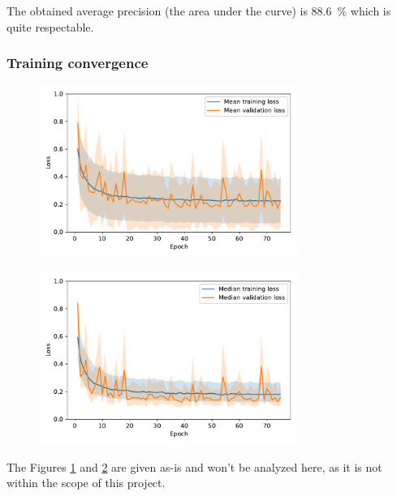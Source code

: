 \documentclass[a4paper, 12pt]{article}
\begin{document}
The obtained average precision (the area under the curve) is \SI{88.6}{\percent} which is quite respectable.

\subsubsection{Training convergence}

\begin{figure}[H]
    \centering
    \includegraphics[width=0.75\textwidth]{resources/pdf/mean_loss.pdf}
    \label{fig:mean_loss}
\end{figure}

\begin{figure}[H]
    \centering
    \includegraphics[width=0.75\textwidth]{resources/pdf/median_loss.pdf}
    \label{fig:median_loss}
\end{figure}

\begin{note}
    The Figures \ref{fig:mean_loss} and \ref{fig:median_loss} are given as-is and won't be analyzed here, as it is not within the scope of this project.
\end{note}
\end{document}
